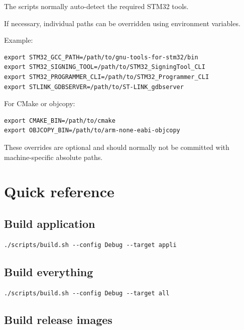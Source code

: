\documentclass[10pt,a4paper,oneside]{report}
\begin{document}
The scripts normally auto-detect the required STM32 tools.

If necessary, individual paths can be overridden using environment variables.

Example:

\begin{verbatim}
export STM32_GCC_PATH=/path/to/gnu-tools-for-stm32/bin
export STM32_SIGNING_TOOL=/path/to/STM32_SigningTool_CLI
export STM32_PROGRAMMER_CLI=/path/to/STM32_Programmer_CLI
export STLINK_GDBSERVER=/path/to/ST-LINK_gdbserver
\end{verbatim}

For CMake or objcopy:

\begin{verbatim}
export CMAKE_BIN=/path/to/cmake
export OBJCOPY_BIN=/path/to/arm-none-eabi-objcopy
\end{verbatim}

These overrides are optional and should normally not be committed with machine-specific absolute paths.

\section{Quick reference}\label{wiki-getting-started-build-flash-debug--14-quick-reference}

\subsection{Build application}\label{wiki-getting-started-build-flash-debug--build-application}

\begin{verbatim}
./scripts/build.sh --config Debug --target appli
\end{verbatim}

\subsection{Build everything}\label{wiki-getting-started-build-flash-debug--build-everything}

\begin{verbatim}
./scripts/build.sh --config Debug --target all
\end{verbatim}

\subsection{Build release images}\label{wiki-getting-started-build-flash-debug--build-release-images}
\end{document}
